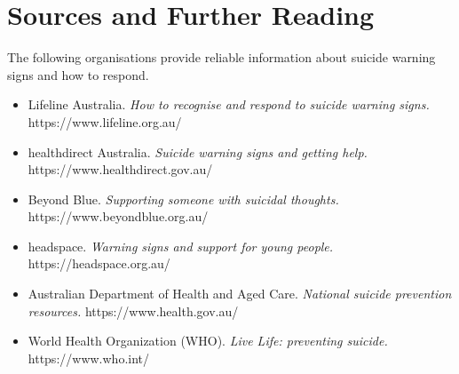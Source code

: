 \section*{Sources and Further Reading}
The following organisations provide reliable information about suicide warning signs and how to respond.

\begin{itemize}
    \item Lifeline Australia. \textit{How to recognise and respond to suicide warning signs.} https://www.lifeline.org.au/
    \item healthdirect Australia. \textit{Suicide warning signs and getting help.} https://www.healthdirect.gov.au/
    \item Beyond Blue. \textit{Supporting someone with suicidal thoughts.} https://www.beyondblue.org.au/
    \item headspace. \textit{Warning signs and support for young people.} https://headspace.org.au/
    \item Australian Department of Health and Aged Care. \textit{National suicide prevention resources.} https://www.health.gov.au/
    \item World Health Organization (WHO). \textit{Live Life: preventing suicide.} https://www.who.int/
\end{itemize}

\clearpage
